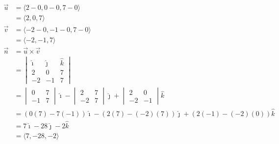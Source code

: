 \documentclass{report}
\begin{document}
\begin{align*}
    \vec{u} & = \langle 2 - 0, 0 - 0, 7 - 0 \rangle                                                  \\
            & = \langle 2, 0, 7 \rangle                                                              \\
    \vec{v} & = \langle -2 - 0, -1 - 0, 7 - 0 \rangle                                                \\
            & = \langle -2, -1, 7 \rangle                                                            \\
    \vec{n} & = \vec{u} \times \vec{v}                                                               \\
            & = \begin{vmatrix}
                    \hat{\imath} & \hat{\jmath} & \hat{k} \\
                    2            & 0            & 7       \\
                    -2           & -1           & 7
                \end{vmatrix}                           \\
            & = \begin{vmatrix}
                    0  & 7 \\
                    -1 & 7
                \end{vmatrix}\hat{\imath} - \begin{vmatrix}
                                                2  & 7 \\
                                                -2 & 7
                                            \end{vmatrix}\hat{\jmath} + \begin{vmatrix}
                                                                            2  & 0  \\
                                                                            -2 & -1
                                                                        \end{vmatrix}\hat{k}         \\
            & = (0(7) - 7(-1))\hat{\imath} - (2(7) - (-2)(7))\hat{\jmath} + (2(-1) - (-2)(0))\hat{k} \\
            & = 7\hat{\imath} - 28\hat{\jmath} - 2\hat{k}                                            \\
            & = \langle 7, -28, -2 \rangle
\end{align*}
\end{document}
